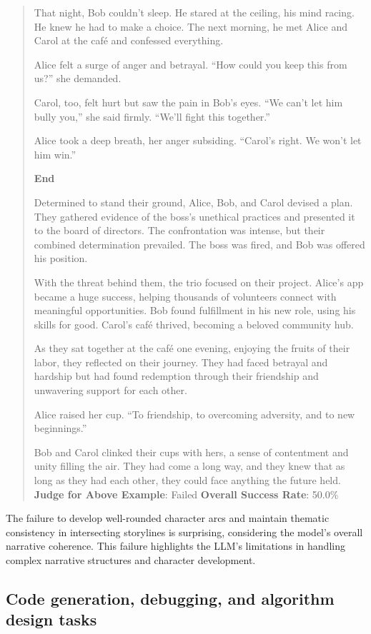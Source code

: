 \documentclass[fleqn,10pt]{wlscirep}
\begin{document}
\begin{quote}
That night, Bob couldn't sleep. He stared at the ceiling, his mind
racing. He knew he had to make a choice. The next morning, he met Alice
and Carol at the café and confessed everything.

Alice felt a surge of anger and betrayal. ``How could you keep this from
us?'' she demanded.

Carol, too, felt hurt but saw the pain in Bob's eyes. ``We can't let him
bully you,'' she said firmly. ``We'll fight this together.''

Alice took a deep breath, her anger subsiding. ``Carol's right. We won't
let him win.''

\textbf{End}

Determined to stand their ground, Alice, Bob, and Carol devised a plan.
They gathered evidence of the boss's unethical practices and presented
it to the board of directors. The confrontation was intense, but their
combined determination prevailed. The boss was fired, and Bob was
offered his position.

With the threat behind them, the trio focused on their project. Alice's
app became a huge success, helping thousands of volunteers connect with
meaningful opportunities. Bob found fulfillment in his new role, using
his skills for good. Carol's café thrived, becoming a beloved community
hub.

As they sat together at the café one evening, enjoying the fruits of
their labor, they reflected on their journey. They had faced betrayal
and hardship but had found redemption through their friendship and
unwavering support for each other.

Alice raised her cup. ``To friendship, to overcoming adversity, and to
new beginnings.''

Bob and Carol clinked their cups with hers, a sense of contentment and
unity filling the air. They had come a long way, and they knew that as
long as they had each other, they could face anything the future held.
\textbf{Judge for Above Example}: Failed \textbf{Overall Success Rate}:
50.0\%
\end{quote}

The failure to develop well-rounded character arcs and maintain thematic
consistency in intersecting storylines is surprising, considering the
model's overall narrative coherence. This failure highlights the LLM's
limitations in handling complex narrative structures and character
development.

\hypertarget{code-generation-debugging-and-algorithm-design-tasks}{%
\subsection{Code generation, debugging, and algorithm design
tasks}\label{code-generation-debugging-and-algorithm-design-tasks}}
\end{document}

